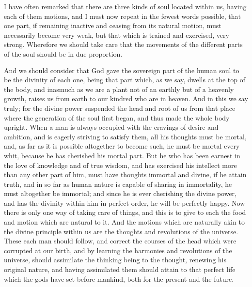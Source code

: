 \documentclass[11pt,letter]{article}
\begin{document}
\par  I have often remarked that there are three kinds of soul located within us, having each of them motions, and I must now repeat in the fewest words possible, that one part, if remaining inactive and ceasing from its natural motion, must necessarily become very weak, but that which is trained and exercised, very strong. Wherefore we should take care that the movements of the different parts of the soul should be in due proportion.

\par  And we should consider that God gave the sovereign part of the human soul to be the divinity of each one, being that part which, as we say, dwells at the top of the body, and inasmuch as we are a plant not of an earthly but of a heavenly growth, raises us from earth to our kindred who are in heaven. And in this we say truly; for the divine power suspended the head and root of us from that place where the generation of the soul first began, and thus made the whole body upright. When a man is always occupied with the cravings of desire and ambition, and is eagerly striving to satisfy them, all his thoughts must be mortal, and, as far as it is possible altogether to become such, he must be mortal every whit, because he has cherished his mortal part. But he who has been earnest in the love of knowledge and of true wisdom, and has exercised his intellect more than any other part of him, must have thoughts immortal and divine, if he attain truth, and in so far as human nature is capable of sharing in immortality, he must altogether be immortal; and since he is ever cherishing the divine power, and has the divinity within him in perfect order, he will be perfectly happy. Now there is only one way of taking care of things, and this is to give to each the food and motion which are natural to it. And the motions which are naturally akin to the divine principle within us are the thoughts and revolutions of the universe. These each man should follow, and correct the courses of the head which were corrupted at our birth, and by learning the harmonies and revolutions of the universe, should assimilate the thinking being to the thought, renewing his original nature, and having assimilated them should attain to that perfect life which the gods have set before mankind, both for the present and the future.
\end{document}
